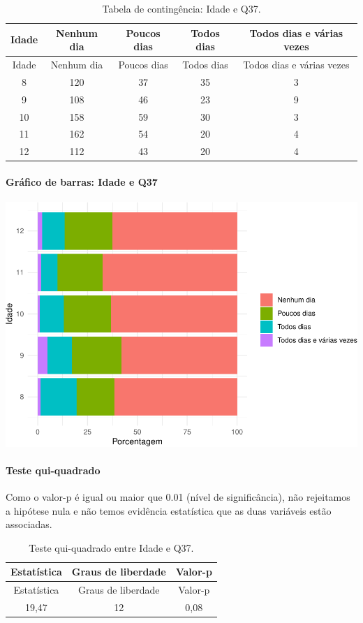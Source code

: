 \documentclass[]{article}
\let\oldparagraph\paragraph
\renewcommand{\paragraph}[1]{\oldparagraph{#1}\mbox{}}
\begin{document}
\begin{longtable}[]{@{}ccccc@{}}
\caption{\label{tab:unnamed-chunk-1390}Tabela de contingência: Idade e Q37.}\tabularnewline
\toprule
Idade & Nenhum dia & Poucos dias & Todos dias & Todos dias e várias vezes\tabularnewline
\midrule
\endfirsthead
\toprule
Idade & Nenhum dia & Poucos dias & Todos dias & Todos dias e várias vezes\tabularnewline
\midrule
\endhead
8 & 120 & 37 & 35 & 3\tabularnewline
9 & 108 & 46 & 23 & 9\tabularnewline
10 & 158 & 59 & 30 & 3\tabularnewline
11 & 162 & 54 & 20 & 4\tabularnewline
12 & 112 & 43 & 20 & 4\tabularnewline
\bottomrule
\end{longtable}

\hypertarget{gruxe1fico-de-barras-idade-e-q37}{%
\paragraph{Gráfico de barras: Idade e Q37}\label{gruxe1fico-de-barras-idade-e-q37}}

\begin{center}\includegraphics[width=0.75\linewidth]{relatorio_covid19_files/figure-latex/unnamed-chunk-1391-1} \end{center}

\hypertarget{teste-qui-quadrado-119}{%
\paragraph{Teste qui-quadrado}\label{teste-qui-quadrado-119}}

Como o valor-p é igual ou maior que 0.01 (nível de significância), não rejeitamos a hipótese nula e não temos evidência estatística que as duas variáveis estão associadas.

\begin{longtable}[]{@{}ccc@{}}
\caption{\label{tab:unnamed-chunk-1393}Teste qui-quadrado entre Idade e Q37.}\tabularnewline
\toprule
Estatística & Graus de liberdade & Valor-p\tabularnewline
\midrule
\endfirsthead
\toprule
Estatística & Graus de liberdade & Valor-p\tabularnewline
\midrule
\endhead
19,47 & 12 & 0,08\tabularnewline
\bottomrule
\end{longtable}
\end{document}
